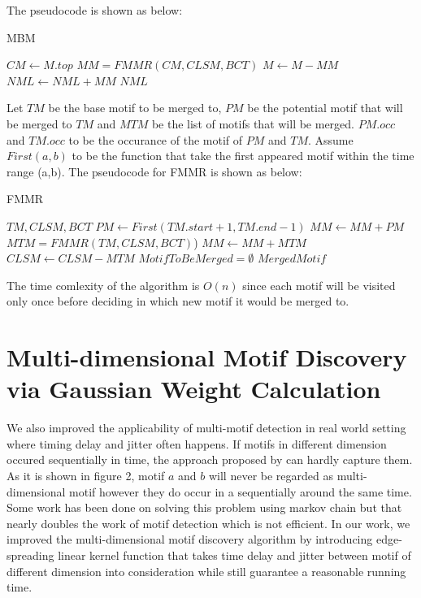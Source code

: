 \documentclass{article}
\begin{document}
The pseudocode is shown as below:

\begin{algorithm}
\caption{MBM}
\begin{algorithmic} 
\STATE $ CM \leftarrow M.top$
\STATE $ MM = FMMR(CM,CLSM,BCT)$
\STATE $M \leftarrow M - MM $
\STATE $NML \leftarrow NML + MM $
\ENDWHILE
\RETURN $NML$
\end{algorithmic}
\end{algorithm}

Let $TM$ be the base motif to be merged to, $PM$ be the potential motif that will be merged to $TM$ and 
$MTM$ be the list of motifs that will be merged. $PM.occ$ and $TM.occ$ to be the occurance of the motif of $PM$ and $TM$. Assume $First(a,b)$ to be the function that take the first appeared motif within the time range (a,b). The pseudocode for FMMR is shown as below:

\begin{algorithm}
\caption{FMMR}
\begin{algorithmic} 
\REQUIRE $TM,CLSM, BCT$
\STATE$PM \leftarrow First(TM.start+1,TM.end-1)$
\STATE $MM \leftarrow MM + PM$
\STATE $MTM = FMMR(TM,CLSM,BCT)$) 
\STATE $MM \leftarrow MM + MTM$
\STATE $CLSM \leftarrow CLSM - MTM$
\ENDIF
\ELSE
\STATE $MotifToBeMerged  = \emptyset$
\ENDIF
\RETURN $MergedMotif$
\end{algorithmic}
\end{algorithm}

The time comlexity of the algorithm is $O(n)$ since each motif will be visited only once before deciding
in which new motif it would be merged to. 

\section{Multi-dimensional Motif Discovery via Gaussian Weight Calculation}

We also improved the applicability of multi-motif detection in real world setting where timing delay and jitter 
often happens. If motifs in different dimension occured sequentially in time, the approach proposed by \cite{Vahdatpour09towardunsupervised} can hardly capture them. As it is shown in figure 2, motif $a$ and $b$ will never be regarded as multi-dimensional motif however they do occur in a sequentially around the same time. Some work has been done on solving this problem using markov chain but that nearly doubles the work of motif detection which is not efficient. In our work, we improved the multi-dimensional motif discovery algorithm by introducing edge-spreading linear kernel function that takes time delay and jitter between motif of different dimension into consideration while still guarantee a reasonable running time. 
 
\end{document}
